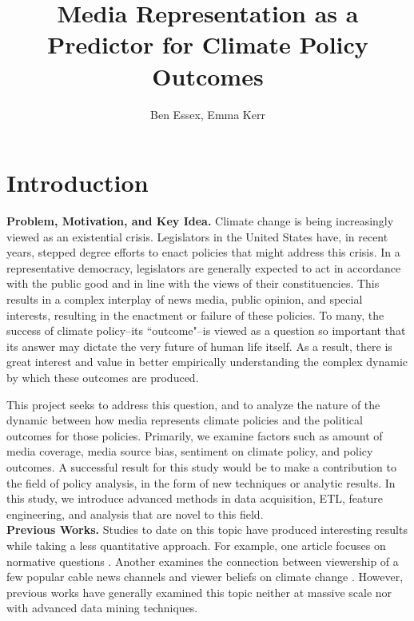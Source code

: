 \documentclass[letterpaper,11pt]{article}
\title{Media Representation as a\\ 
\vspace{.1in} 
Predictor for Climate Policy Outcomes}
\author{Ben Essex, Emma Kerr}
\date{}
\begin{document}
\maketitle


\section{Introduction}

\vspace{.1in}

\quad\textbf{Problem, Motivation, and Key Idea.}
Climate change is being increasingly viewed as an existential crisis. Legislators in the United States have, in recent years, stepped degree efforts to enact policies that might address this crisis. In a representative democracy, legislators are generally expected to act in accordance with the public good and in line with the views of their constituencies. This results in a complex interplay of news media, public opinion, and special interests, resulting in the enactment or failure of these policies. To many, the success of climate policy--its ``outcome"--is viewed as a question so important that its answer may dictate the very future of human life itself. As a result, there is great interest and value in better empirically understanding the complex dynamic by which these outcomes are produced.

This project seeks to address this question, and to analyze the nature of the dynamic between how media represents climate policies and the political outcomes for those policies. Primarily, we examine factors such as amount of media coverage, media source bias, sentiment on climate policy, and policy outcomes. A successful result for this study would be to make a contribution to the field of policy analysis, in the form of new techniques or analytic results. In this study, we introduce advanced methods in data acquisition, ETL, feature engineering, and analysis that are novel to this field. \\

\textbf{Previous Works.}
Studies to date on this topic have produced interesting results while taking a less quantitative approach. For example, one article focuses on normative questions \cite{boykoff2007climate}. Another examines the connection between viewership of a few popular cable news channels and viewer beliefs on climate change \cite{feldman2012climate}. However, previous works have generally examined this topic neither at massive scale nor with advanced data mining techniques.
\end{document}
